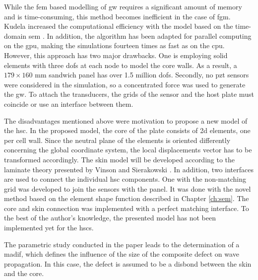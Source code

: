 While the \ac{fem} based modelling of \ac{gw} requires a significant amount of memory and is time-consuming, this method becomes inefficient in the case of \ac{fgm}.
Kudela increased the computational efficiency with the model based on the time-domain \ac{sem} \cite{kudela2016parallel}.
In addition, the algorithm has been adapted for parallel computing on the \ac{gpu}, making the simulations fourteen times as fast as on the \ac{cpu}.
However, this approach has two major drawbacks. One is employing solid elements with three \acp{dof} at each node to model the core walls. As a result, a $179\times160$ mm sandwich panel has over 1.5 million \acp{dof}.
Secondly, no \ac{pzt} sensors were considered in the simulation, so a concentrated force was used to generate the \ac{gw}.
To attach the transducers, the grids of the sensor and the host plate must coincide or use an interface between them. 

The disadvantages mentioned above were motivation to propose a new model of the \ac{hsc}.
In the proposed model, the core of the plate consists of \ac{2d} elements, one per cell wall.
Since the neutral plane of the elements is oriented differently concerning the global coordinate system, the local displacements vector has to be transformed accordingly.
The skin model will be developed according to the laminate theory presented by Vinson and Sierakowski \cite{vinson1993behavior}.
In addition, two interfaces are used to connect the individual \ac{hsc} components.
One with the non-matching grid was developed to join the sensors with the panel.
It was done with the novel method based on the element shape function described in Chapter \ref{ch:sem}.
The core and skin connection was implemented with a perfect matching interface.
To the best of the author's knowledge, the presented model has not been implemented yet for the \acp{hsc}.

The parametric study conducted in the paper leads to the determination of a \ac{madif}, which defines the influence of the size of the composite defect on wave propagation.
In this case, the defect is assumed to be a disbond between the skin and the core.